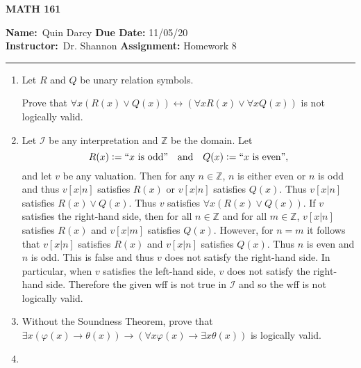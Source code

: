 \documentclass[12pt]{article}
\makeatletter
\theoremstyle{definition}
\theoremstyle{remark}
\renewenvironment{proof}[1][\proofname]{\par
  \pushQED{\qed}%
  \normalfont \topsep6\p@\@plus6\p@\relax
  \list{}{\leftmargin=0mm
          \rightmargin=4mm
          \settowidth{\itemindent}{\itshape#1}%
          \labelwidth=\itemindent
          \parsep=0pt \listparindent=\parindent 
  }
  \item[\hskip\labelsep
        \itshape
    #1\@addpunct{.}]\ignorespaces
}{%
  \popQED\endlist\@endpefalse
}
\let\oldproofname=\proofname
\renewcommand{\proofname}{\bf{\textit{\oldproofname}}}
\makeatother
\begin{document}
\thispagestyle{empty}\hline

\begin{center}
	\vspace{.4cm} {\textbf { \large MATH 161}}
\end{center}
{\textbf{Name:}\ Quin Darcy \hspace{\fill} \textbf{Due Date:} 11/05/20   \\
{ \textbf{Instructor:}}\ Dr. Shannon \hspace{\fill} \textbf{Assignment:} Homework 8 \\ \hrule}

\justifying
    \begin{enumerate}[leftmargin=*]
        \item Let $R$ and $Q$ be unary relation symbols.\par Prove that $\forall x(R(x)\lor Q(x))\leftrightarrow(\forall xR(x)\lor\forall xQ(x))$ is not logically valid.
            \begin{proof}
                Let $\mathcal{I}$ be any interpretation and $\mathbb{Z}$ be the domain. Let
                    \begin{equation*}
                        R(x):=``x \text{ is odd}"\quad \text{and}\quad Q(x):=``x \text{ is even}",
                    \end{equation*}
                and let $v$ be any valuation. Then for any $n\in\mathbb{Z}$, $n$ is either even or $n$ is odd and thus $v[x|n]$ satisfies $R(x)$ or $v[x|n]$ satisfies $Q(x)$. Thus $v[x|n]$ satisfies $R(x)\lor Q(x)$. Thus $v$ satisfies $\forall x(R(x)\lor Q(x))$. If $v$ satisfies the right-hand side, then for all $n\in\mathbb{Z}$ and for all $m\in\mathbb{Z}$, $v[x|n]$ satisfies $R(x)$ and $v[x|m]$ satisfies $Q(x)$. However, for $n=m$ it follows that $v[x|n]$ satisfies $R(x)$ and $v[x|n]$ satisfies $Q(x)$. Thus $n$ is even and $n$ is odd. This is false and thus $v$ does not satisfy the right-hand side. In particular, when $v$ satisfies the left-hand side, $v$ does not satisfy the right-hand side. Therefore the given wff is not true in $\mathcal{I}$ and so the wff is not logically valid. 
            \end{proof}
        \item Without the Soundness Theorem, prove that $\exists x(\varphi(x)\rightarrow\theta(x))\rightarrow(\forall x\varphi(x)\rightarrow\exists x\theta(x))$ is logically valid.
            \begin{proof}

\end{proof}
\end{enumerate}
\end{document}

